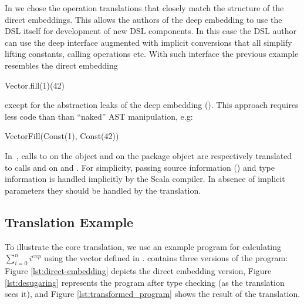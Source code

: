 In \yy we chose the operation translations that closely match the structure of
 the direct embeddings. This allows the authors of the deep embedding to use the
 DSL itself for development of new DSL components. In this case the DSL author can use
 the deep interface augmented with implicit conversions that all simplify lifting constants,
 calling operations etc. With such interface the previous example resembles the direct embedding\begin{lstparagraph}
Vector.fill(1)(42)
\end{lstparagraph}
except for the abstraction leaks of the deep embedding ().
This approach requires less code than than ``naked'' AST manipulation, e.g:\begin{lstparagraph}
VectorFill(Const(1), Const(42))
\end{lstparagraph}


 In~, calls to  on the object
  and  on the package object 
 are respectively translated to calls  and  on
  and . For simplicity, passing source
 information () and type information  is
 handled implicitly by the Scala compiler. In absence of implicit parameters
 they should be handled by the translation.

\subsection{Translation Example}
\label{sct:translation-example}

To illustrate the core translation, we use an example program for calculating $\sum_{i=0}^n i^{exp}$ using the vector \edsl defined in .  contains three versions of the program: Figure \ref{lst:direct-embedding} depicts the direct embedding version, Figure \ref{lst:desugaring} represents the program after type checking (as the translation sees it), and Figure \ref{lst:transformed_program} shows the result of the translation.


